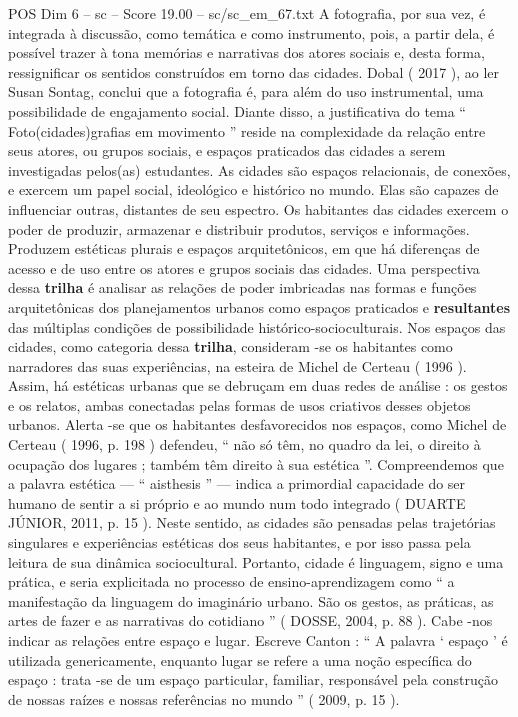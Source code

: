 \begin{textsample}{POS Dim 6 – sc – Score 19.00 – sc/sc\_em\_67.txt}
A fotografia, por sua vez, é integrada à discussão, como temática e como instrumento, pois, a partir dela, é possível trazer à tona memórias e narrativas dos atores sociais e, desta forma, ressignificar os sentidos construídos em torno das cidades.
Dobal ( 2017 ), ao ler Susan Sontag, conclui que a fotografia é, para além do uso instrumental, uma possibilidade de engajamento social.
Diante disso, a justificativa do tema “ Foto(cidades)grafias em movimento ” reside na complexidade da relação entre seus atores, ou grupos sociais, e espaços praticados das cidades a serem investigadas pelos(as) estudantes.
As cidades são espaços relacionais, de conexões, e exercem um papel social, ideológico e histórico no mundo.
Elas são capazes de influenciar outras, distantes de seu espectro.
Os habitantes das cidades exercem o poder de produzir, armazenar e distribuir produtos, serviços e informações.
Produzem estéticas plurais e espaços arquitetônicos, em que há diferenças de acesso e de uso entre os atores e grupos sociais das cidades.
Uma perspectiva dessa \textbf{trilha} é analisar as relações de poder imbricadas nas formas e funções arquitetônicas dos planejamentos urbanos como espaços praticados e \textbf{resultantes} das múltiplas condições de possibilidade histórico-socioculturais.
Nos espaços das cidades, como categoria dessa \textbf{trilha}, consideram -se os habitantes como narradores das suas experiências, na esteira de Michel de Certeau ( 1996 ).
Assim, há estéticas urbanas que se debruçam em duas redes de análise : os gestos e os relatos, ambas conectadas pelas formas de usos criativos desses objetos urbanos.
Alerta -se que os habitantes desfavorecidos nos espaços, como Michel de Certeau ( 1996, p. 198 ) defendeu, “ não só têm, no quadro da lei, o direito à ocupação dos lugares ; também têm direito à sua estética ”.
Compreendemos que a palavra estética — “ aisthesis ” — indica a primordial capacidade do ser humano de sentir a si próprio e ao mundo num todo integrado ( DUARTE JÚNIOR, 2011, p. 15 ).
Neste sentido, as cidades são pensadas pelas trajetórias singulares e experiências estéticas dos seus habitantes, e por isso passa pela leitura de sua dinâmica sociocultural.
Portanto, cidade é linguagem, signo e uma prática, e seria explicitada no processo de ensino-aprendizagem como “ a manifestação da linguagem do imaginário urbano.
São os gestos, as práticas, as artes de fazer e as narrativas do cotidiano ” ( DOSSE, 2004, p. 88 ).
Cabe -nos indicar as relações entre espaço e lugar.
Escreve Canton : “ A palavra ‘ espaço ’ é utilizada genericamente, enquanto lugar se refere a uma noção específica do espaço : trata -se de um espaço particular, familiar, responsável pela construção de nossas raízes e nossas referências no mundo ” ( 2009, p. 15 ).

\end{textsample}
